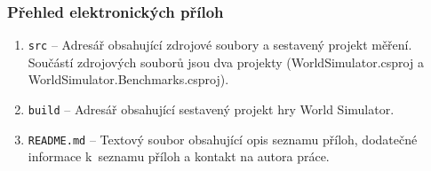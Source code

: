\label{chap:attachments}

\subsubsection{Přehled elektronických příloh}

\begin{enumerate}
    \item \texttt{src} -- Adresář obsahující zdrojové soubory a sestavený projekt měření. Součástí zdrojových souborů jsou dva projekty (WorldSimulator.csproj a WorldSimulator.Benchmarks.csproj).

    \item \texttt{build} -- Adresář obsahující sestavený projekt hry World Simulator.

    \item \texttt{README.md} -- Textový soubor obsahující opis seznamu příloh, dodatečné informace k~seznamu příloh a kontakt na autora práce.
\end{enumerate}